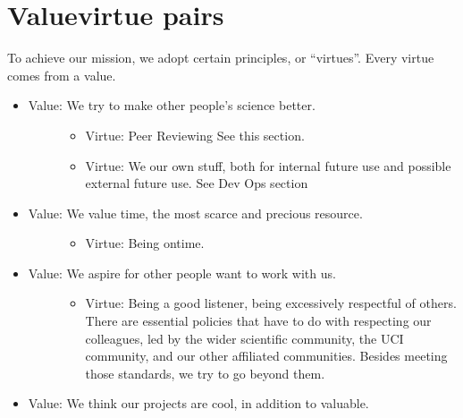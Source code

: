 \documentclass[letterpaper,10pt,english]{sphinxmanual}
\begin{document}
\section{Value\sphinxhyphen{}virtue pairs}
\label{\detokenize{01OurMission:value-virtue-pairs}}
\sphinxAtStartPar
To achieve our mission, we adopt certain principles, or “virtues”. Every virtue comes from a value.
\begin{itemize}
\item {} \begin{description}
\item[{Value: We try to make other people’s science better.}] \leavevmode\begin{itemize}
\item {} 
\sphinxAtStartPar
Virtue: Peer Reviewing See this {\hyperref[\detokenize{PeerReviewing:peer-reviewing}]{}} section.

\item {} 
\sphinxAtStartPar
Virtue: We  our own stuff, both for internal future use and possible external future use. See Dev Ops section

\end{itemize}

\end{description}

\item {} \begin{description}
\item[{Value: We value time, the most scarce and precious resource.}] \leavevmode\begin{itemize}
\item {} 
\sphinxAtStartPar
Virtue: Being on\sphinxhyphen{}time.

\end{itemize}

\end{description}

\item {} \begin{description}
\item[{Value: We aspire for other people want to work with us.}] \leavevmode\begin{itemize}
\item {} 
\sphinxAtStartPar
Virtue: Being a good listener, being excessively respectful of others. There are essential policies that have to do with respecting our colleagues, led by the wider scientific community, the UCI community, and our other affiliated communities. Besides meeting those standards, we try to go beyond them.

\end{itemize}

\end{description}

\item {} 
\sphinxAtStartPar
Value: We think our projects are cool, in addition to valuable.
\sphinxhyphen{} 

\end{itemize}
\end{document}
